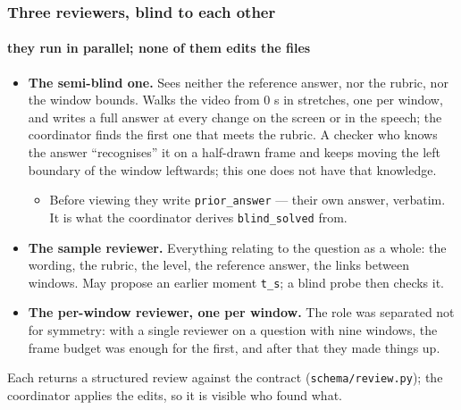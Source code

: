 \documentclass[aspectratio=169,10pt]{beamer}
\newcommand{\lead}[1]{{\color{warm}\textbf{#1}}}
\begin{document}
\begin{frame}
  \frametitle{Three reviewers, blind to each other}
  \framesubtitle{they run in parallel; none of them edits the files}

  \begin{itemize}
    \item \lead{The semi-blind one.} Sees neither the reference answer, nor the rubric, nor the window
          bounds. Walks the video from 0 s in stretches, one per window, and writes a full answer at every
          change on the screen or in the speech; the coordinator finds the first one that meets the rubric.
          A checker who knows the answer ``recognises'' it on a half-drawn frame and keeps moving
          the left boundary of the window leftwards; this one does not have that knowledge.
          \begin{itemize}
            \item[] {\small Before viewing they write \texttt{prior\_answer} — their own answer, verbatim.
                    It is what the coordinator derives \texttt{blind\_solved} from.}
          \end{itemize}
    \item \lead{The sample reviewer.} Everything relating to the question as a whole: the wording,
          the rubric, the level, the reference answer, the links between windows. May propose an earlier
          moment \texttt{t\_s}; a blind probe then checks it.
    \item \lead{The per-window reviewer, one per window.} The role was separated not for symmetry:
          with a single reviewer on a question with nine windows, the frame budget was enough
          for the first, and after that they made things up.
  \end{itemize}

  \vspace{0.5em}
  {\color{muted}\small Each returns a structured review against the contract
  (\texttt{schema/review.py}); the coordinator applies the edits, so it is visible who found what.}
\end{frame}
\end{document}
